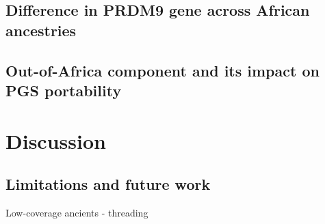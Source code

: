 
\subsection{Difference in PRDM9 gene across African ancestries}


\subsection{Out-of-Africa component and its impact on PGS portability}


\section{Discussion}
\subsection{Limitations and future work}
Low-coverage ancients - threading